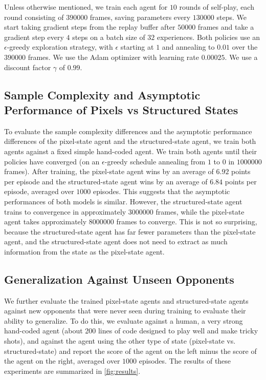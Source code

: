 \documentclass[10pt,twocolumn,letterpaper]{article}
\begin{document}
Unless otherwise mentioned, we train each agent for $10$ rounds of self-play,
each round consisting of $390000$ frames, saving parameters every $130000$
steps. We start taking gradient steps from the replay buffer after $50000$
frames and take a gradient step every $4$ steps on a batch size of $32$
experiences. Both policies use an $\epsilon$-greedy exploration strategy, with
$\epsilon$ starting at $1$ and annealing to $0.01$ over the $390000$ frames.
We use the Adam optimizer \citep{kingma2014adam} with learning rate $0.00025$.
We use a discount factor $\gamma$ of $0.99$.

\subsection{Sample Complexity and Asymptotic Performance of Pixels vs
Structured States}
To evaluate the sample complexity differences and the asymptotic performance
differences of the pixel-state agent and the structured-state agent, we train
both agents against a fixed simple hand-coded agent. We train both agents
until their policies have converged (on an $\epsilon$-greedy schedule
annealing from $1$ to $0$ in $1000000$ frames). After training, the
pixel-state agent wins by an average of $6.92$ points per episode and the
structured-state agent wins by an average of $6.84$ points per episode,
averaged over $1000$ episodes. This suggests that the asymptotic performances
of both models is similar. However, the structured-state agent trains to
convergence in approximately $3000000$ frames, while the pixel-state agent
takes approximately $8000000$ frames to converge. This is not so surprising,
because the structured-state agent has far fewer parameters than the
pixel-state agent, and the structured-state agent does not need to extract as
much information from the state as the pixel-state agent.

\subsection{Generalization Against Unseen Opponents}
We further evaluate the trained pixel-state agents and structured-state agents
against new opponents that were never seen during training to evaluate their
ability to generalize. To do this, we evaluate against a human, a very strong
hand-coded agent (about 200 lines of code designed to play well and make
tricky shots), and against the agent using the other type of state
(pixel-state vs. structured-state) and report the score of the agent on the
left minus the score of the agent on the right, averaged over $1000$ episodes.
The results of these experiments are summarized in \ref{fig:results}.
\end{document}
